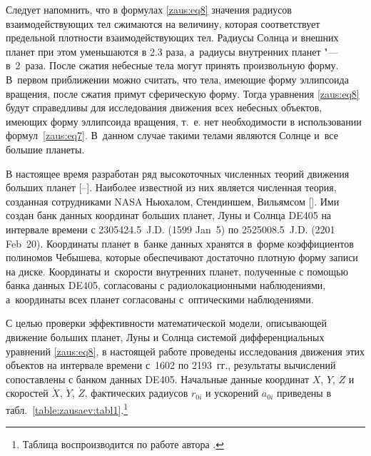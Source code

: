 Следует напомнить, что в формулах \eqref{zaus:eq8} значения радиусов взаимодействующих тел сжимаются на величину, которая соответствует предельной плотности взаимодействующих тел. 
Радиусы Солнца и внешних планет при этом уменьшаются в 2.3 раза, а~радиусы внутренних планет "--- в~2~раза. 
После сжатия небесные тела могут принять произвольную форму. 
В~первом приближении можно считать, что тела, имеющие форму эллипсоида вращения, после сжатия примут сферическую форму. 
Тогда уравнения \eqref{zaus:eq8} будут справедливы для исследования движения всех небесных объектов, имеющих форму эллипсоида вращения, т.~е. нет необходимости в использовании формул~\eqref{zaus:eq7}.  
В~данном случае такими телами являются Солнце и~все большие планеты.

В настоящее время разработан ряд высокоточных численных теорий движения больших планет [--].
Наиболее известной из них является численная теория, созданная сотрудниками NASA Ньюхалом, Стендиншем, Вильямсом []. 
Ими создан банк данных координат больших планет, Луны и Солнца DE405 на интервале времени с 2305424.5~J.D. (1599 Jan~5) 
по 2525008.5~J.D. (2201 Feb~20). 
Координаты планет в~банке данных хранятся в~форме коэффициентов полиномов Чебышева, которые обеспечивают достаточно плотную форму записи на диске. 
Координаты и~скорости внутренних планет, полученные с помощью банка данных DE405, согласованы с радиолокационными наблюдениями, а~координаты всех планет согласованы с~оптическими наблюдениями.

С целью проверки эффективности математической модели, описывающей движение больших планет, Луны и Солнца системой дифференциальных уравнений \eqref{zaus:eq8}, в настоящей работе проведены исследования движения этих объектов на интервале времени с~1602 по 2193~гг., 
результаты вычислений сопоставлены с банком данных DE405. 
Начальные данные координат $X$, $Y$, $Z$  и скоростей  $\dot{X}$, $\dot{Y}$,  $\dot{Z}$, фактических радиусов $r_{0i}$ и ускорений $a_{0i}$ приведены в табл.~\ref{table:zausaev:tabl1}.\footnote{Таблица воспроизводится по работе автора \cite{zaus:11}.}


